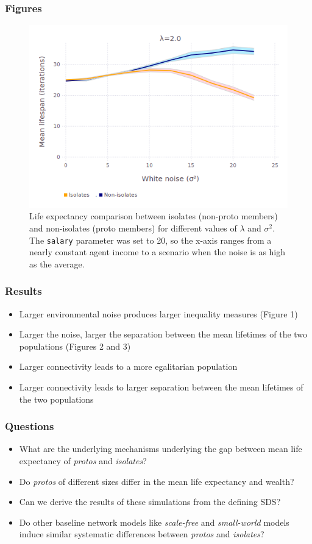 \documentclass{beamer}
\begin{document}
\begin{frame}[t]
\frametitle{Figures}
\begin{figure}[ht]
\centering
\includegraphics[scale=.4]{figures/avgLifespanLambda2.png}
\caption{Life expectancy comparison between isolates (non-proto members) and
non-isolates (proto members) for different values of $\lambda$ and $\sigma^2$.
The \texttt{salary} parameter was set to 20, so the x-axis ranges from a nearly
constant agent income to a scenario when the noise is as high as the average.}
\label{fig:avgLifespanLambda}
\end{figure}
\end{frame}

\begin{frame}[t]
\frametitle{Results}
\begin{itemize}
\item Larger environmental noise produces larger inequality measures (Figure 1)
\item Larger the noise, larger the separation between the mean lifetimes of the two populations (Figures 2 and 3) 
\item Larger connectivity leads to a more egalitarian population
\item Larger connectivity leads to larger separation between the mean lifetimes of the two populations
\end{itemize}

\end{frame}

\begin{frame}[t]
\frametitle{Questions}
\begin{itemize}
\item What are the underlying mechanisms underlying the gap between mean life expectancy of \textit{protos} and \textit{isolates}?
\item Do \textit{protos} of different sizes differ in the mean life expectancy and wealth? 
\item Can we derive the results of these simulations from the defining SDS?
\item Do other baseline network models like \textit{scale-free} and \textit{small-world} models induce similar systematic differences between \textit{protos} and \textit{isolates}?
\end{itemize}
\end{frame}
\end{document}
